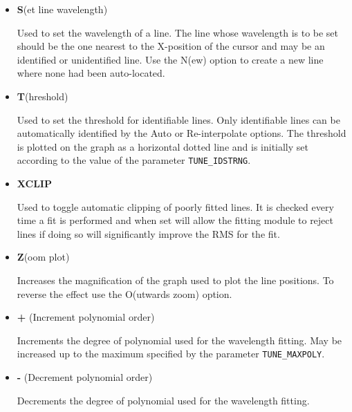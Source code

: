 \documentclass[11pt,twoside]{article}
\newcommand{\htmlref}[2]{#1}
\newcommand{\sunspec}[2]{#1}
\renewcommand{\sunspec}[2]{#2}
\newcommand{\myindex}[1]{\index{#1}}
\renewcommand{\myindex}[1]{}
\begin{document}
\begin{itemize}
\begin{itemize}
      \item {\sunspec{\Large\tt}{\bf} S}(et line wavelength)
            \myindex{Arc fitting!set wavelength}

            Used to set the
            wavelength of a line. The line whose wavelength is to be set
            should be the one nearest to the X-position of the cursor and
            may be an identified or unidentified line. Use the N(ew) option
            to create a new line where none had been auto-located.

      \item {\sunspec{\Large\tt}{\bf} T}(hreshold)

            Used to set the threshold for
            identifiable lines. Only identifiable lines can be
            automatically identified by the Auto or Re-interpolate options.
            The threshold is plotted on the graph as a horizontal dotted
            line and is initially set according to the value of the
            parameter \htmlref{{\tt TUNE\_IDSTRNG}}{par_TUNE_IDSTRNG}\@.

      \item {\sunspec{\Large\tt}{\bf} XCLIP}

            Used to toggle automatic clipping of
            poorly fitted lines.  It is checked every time a fit is
            performed and when set will allow the fitting module to reject
            lines if doing so will significantly improve the RMS for the
            fit.

      \item {\sunspec{\Large\tt}{\bf} Z}(oom plot)

            Increases the magnification of the
            graph used to plot the line positions. To reverse the effect
            use the O(utwards zoom) option.

      \item {\sunspec{\Large\tt}{\bf} +} (Increment polynomial order)

            Increments the degree
            of polynomial used for the wavelength fitting. May be increased
            up to the maximum specified by the parameter
            \htmlref{{\tt TUNE\_MAXPOLY}}{par_TUNE_MAXPOLY}\@.

      \item {\sunspec{\Large\tt}{\bf} -} (Decrement polynomial order)

            Decrements the degree
            of polynomial used for the wavelength fitting.


\end{itemize}
\end{itemize}
\end{document}
